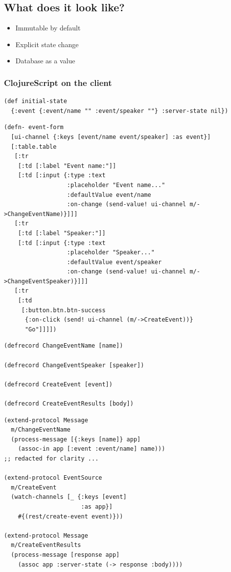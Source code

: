\documentclass[11pt]{article}
\begin{document}
\subsection*{What does it look like?}
\label{sec:orgheadline22}

\begin{itemize}
\item Immutable by default
\item Explicit state change
\item Database as a value
\end{itemize}

\subsubsection*{ClojureScript on the client}
\label{sec:orgheadline20}

\begin{verbatim}
(def initial-state
  {:event {:event/name "" :event/speaker ""} :server-state nil})
\end{verbatim}
\begin{verbatim}
(defn- event-form
  [ui-channel {:keys [event/name event/speaker] :as event}]
  [:table.table
   [:tr
    [:td [:label "Event name:"]]
    [:td [:input {:type :text
                  :placeholder "Event name..."
                  :defaultValue event/name
                  :on-change (send-value! ui-channel m/->ChangeEventName)}]]]
   [:tr
    [:td [:label "Speaker:"]]
    [:td [:input {:type :text
                  :placeholder "Speaker..."
                  :defaultValue event/speaker
                  :on-change (send-value! ui-channel m/->ChangeEventSpeaker)}]]]
   [:tr
    [:td
     [:button.btn.btn-success
      {:on-click (send! ui-channel (m/->CreateEvent))}
      "Go"]]]])
\end{verbatim}

\begin{verbatim}
(defrecord ChangeEventName [name])

(defrecord ChangeEventSpeaker [speaker])

(defrecord CreateEvent [event])

(defrecord CreateEventResults [body])
\end{verbatim}
\begin{verbatim}
(extend-protocol Message
  m/ChangeEventName
  (process-message [{:keys [name]} app]
    (assoc-in app [:event :event/name] name)))
;; redacted for clarity ...

(extend-protocol EventSource
  m/CreateEvent
  (watch-channels [_ {:keys [event]
                      :as app}]
    #{(rest/create-event event)}))

(extend-protocol Message
  m/CreateEventResults
  (process-message [response app]
    (assoc app :server-state (-> response :body))))
\end{verbatim}
\end{document}
